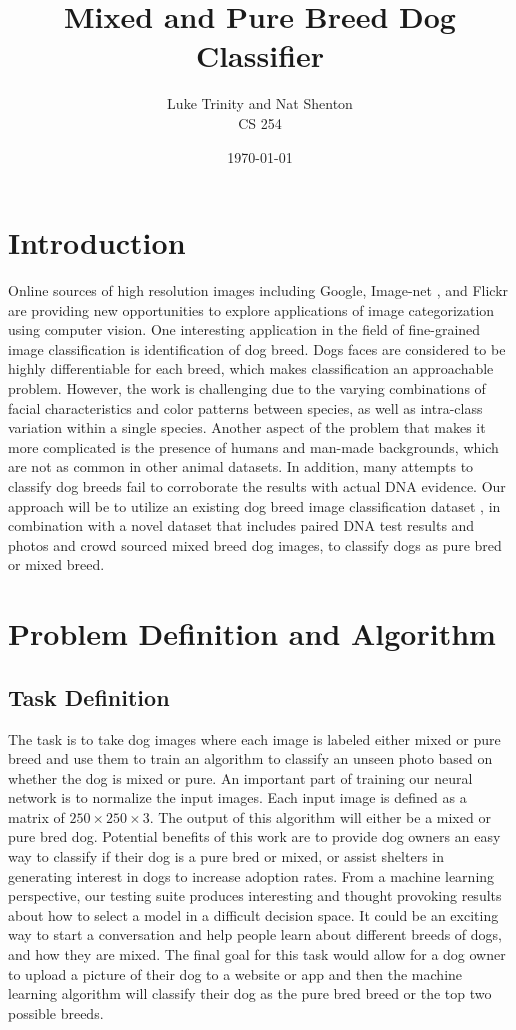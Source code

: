 \documentclass[12pt]{article}
\title{Mixed and Pure Breed Dog Classifier}
\date{\today}
\author{Luke Trinity and Nat Shenton \\ CS 254}
\begin{document}
 
\maketitle
\section{Introduction}

Online sources of high resolution images including Google, Image-net \cite{deng2009imagenet}, and Flickr are providing new opportunities to explore applications of image categorization using computer vision. One interesting application in the field of fine-grained image classification is identification of dog breed. Dogs faces are considered to be highly differentiable for each breed, which makes classification an approachable problem. However, the work is challenging due to the varying combinations of facial characteristics and color patterns between species, as well as intra-class variation within a single species. Another aspect of the problem that makes it more complicated is the presence of humans and man-made backgrounds, which are not as common in other animal datasets. In addition, many attempts to classify dog breeds fail to corroborate the results with actual DNA evidence. Our approach will be to utilize an existing dog breed image classification dataset \cite{khosla2011novel}, in combination with a novel dataset that includes paired DNA test results and photos \cite{voith2009comparison} and crowd sourced mixed breed dog images, to classify dogs as pure bred or mixed breed. 

\section{Problem Definition and Algorithm}

\subsection{Task Definition}

The task is to take dog images where each image is labeled either mixed or pure breed and use them to train an algorithm to classify an unseen photo based on whether the dog is mixed or pure. An important part of training our neural network is to normalize the input images. Each input image is defined as a matrix of $250\times 250\times3$. The output of this algorithm will either be a mixed or pure bred dog. Potential benefits of this work are to provide dog owners an easy way to classify if their dog is a pure bred or mixed, or assist shelters in generating interest in dogs to increase adoption rates. From a machine learning perspective, our testing suite produces interesting and thought provoking results about how to select a model in a difficult decision space. It could be an exciting way to start a conversation and help people learn about different breeds of dogs, and how they are mixed. The final goal for this task would allow for a dog owner to upload a picture of their dog to a website or app and then the machine learning algorithm will classify their dog as the pure bred breed or the top two possible breeds.
\end{document}
